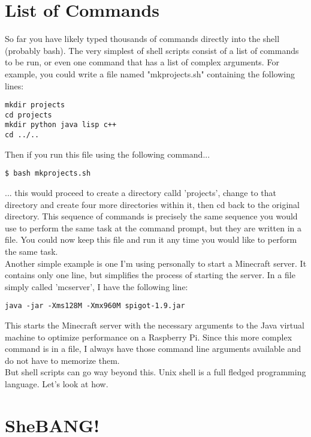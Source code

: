 \section{List of Commands}

So far you have likely typed thousands of commands directly into the shell (probably bash).  The very simplest of shell scripts consist of a list of commands to be run, or even one command that has a list of complex arguments.  For example, you could write a file named "mkprojects.sh" containing the following lines:

\begin{verbatim}
mkdir projects
cd projects
mkdir python java lisp c++
cd ../..
\end{verbatim}

Then if you run this file using the following command...

\begin{verbatim}
$ bash mkprojects.sh
\end{verbatim}

... this would proceed to create a directory calld 'projects', change to that directory and create four more directories within it, then cd back to the original directory.  This sequence of commands is precisely the same sequence you would use to perform the same task at the command prompt, but they are written in a file.  You could now keep this file and run it any time you would like to perform the same task.\\

Another simple example is one I'm using personally to start a Minecraft server.  It contains only one line, but simplifies the process of starting the server. In a file simply called 'mcserver', I have the following line:

\begin{verbatim}
java -jar -Xms128M -Xmx960M spigot-1.9.jar
\end{verbatim}

This starts the Minecraft server with the necessary arguments to the Java virtual machine to optimize performance on a Raspberry Pi.  Since this more complex command is in a file, I always have those command line arguments available and do not have to memorize them.\\

But shell scripts can go way beyond this.  Unix shell is a full fledged programming language.  Let's look at how.

\section{SheBANG!}

